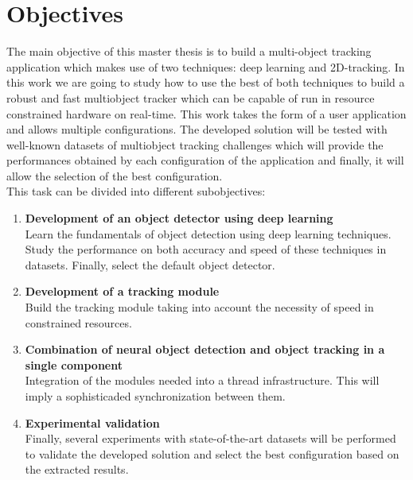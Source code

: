 \section{Objectives}
The main objective of this master thesis is to build a multi-object tracking application which makes use of two techniques: deep learning and 2D-tracking. In this work we are going to study how to use the best of both techniques to build a robust and fast multiobject tracker which can be capable of run in resource constrained hardware on real-time. This work takes the form of a user application and allows multiple configurations. The developed solution will be tested with well-known datasets of multiobject tracking challenges which will provide the performances obtained by each configuration of the application and finally, it will allow the selection of the best configuration.\\
This task can be divided into different subobjectives:
\begin{enumerate}
\item \textbf{Development of an object detector using deep learning}\\\label{first_objective}
Learn the fundamentals of object detection using deep learning techniques. Study the performance on both accuracy and speed of these techniques in datasets. Finally, select the default object detector.
\item \textbf{Development of a tracking module}\\
Build the tracking module taking into account the necessity of speed in constrained resources.
\item \textbf{Combination of neural object detection and object tracking in a single component}\\
Integration of the modules needed into a thread infrastructure. This will imply a sophisticaded synchronization between them.
\item \textbf{Experimental validation}\\
Finally, several experiments with state-of-the-art datasets will be performed to validate the developed solution and select the best configuration based on the extracted results.
\end{enumerate}

